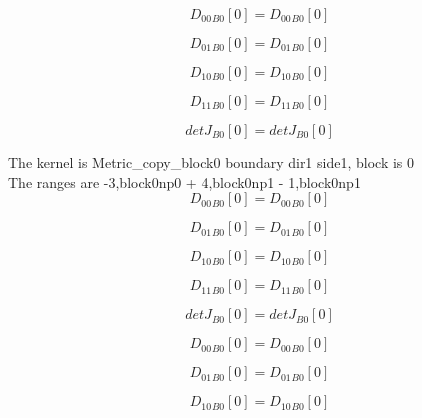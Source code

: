 \documentclass{article}
\begin{document}
\begin{dmath}{D_{00}{_{B0}}}[{0}] = {D_{00}{_{B0}}}[{0}]\end{dmath}

\begin{dmath}{D_{01}{_{B0}}}[{0}] = {D_{01}{_{B0}}}[{0}]\end{dmath}

\begin{dmath}{D_{10}{_{B0}}}[{0}] = {D_{10}{_{B0}}}[{0}]\end{dmath}

\begin{dmath}{D_{11}{_{B0}}}[{0}] = {D_{11}{_{B0}}}[{0}]\end{dmath}

\begin{dmath}{detJ{_{B0}}}[{0}] = {detJ{_{B0}}}[{0}]\end{dmath}

\noindent The kernel is Metric_copy_block0 boundary dir1 side1, block is 0\\\noindent The ranges are -3,block0np0 + 4,block0np1 - 1,block0np1\\\begin{dmath}{D_{00}{_{B0}}}[{0}] = {D_{00}{_{B0}}}[{0}]\end{dmath}

\begin{dmath}{D_{01}{_{B0}}}[{0}] = {D_{01}{_{B0}}}[{0}]\end{dmath}

\begin{dmath}{D_{10}{_{B0}}}[{0}] = {D_{10}{_{B0}}}[{0}]\end{dmath}

\begin{dmath}{D_{11}{_{B0}}}[{0}] = {D_{11}{_{B0}}}[{0}]\end{dmath}

\begin{dmath}{detJ{_{B0}}}[{0}] = {detJ{_{B0}}}[{0}]\end{dmath}

\begin{dmath}{D_{00}{_{B0}}}[{0}] = {D_{00}{_{B0}}}[{0}]\end{dmath}

\begin{dmath}{D_{01}{_{B0}}}[{0}] = {D_{01}{_{B0}}}[{0}]\end{dmath}

\begin{dmath}{D_{10}{_{B0}}}[{0}] = {D_{10}{_{B0}}}[{0}]\end{dmath}
\end{document}
